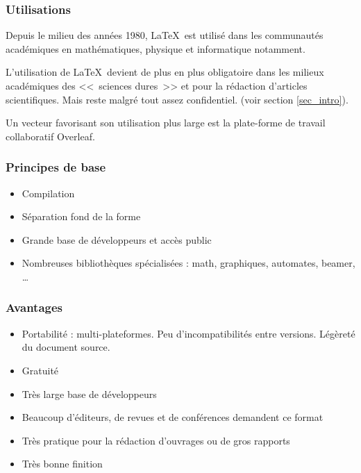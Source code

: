 \documentclass[a4paper, french]{article}
\begin{document}
\subsubsection{Utilisations} 

Depuis le milieu des années 1980, \LaTeX ~est utilisé dans les communautés académiques en mathématiques, physique et informatique notamment.

L'utilisation de \LaTeX ~devient de plus en plus obligatoire dans les milieux académiques des <<~sciences dures~>> et pour la rédaction d'articles scientifiques. Mais reste malgré tout assez confidentiel. (voir section \ref{sec_intro}).

Un vecteur favorisant son utilisation plus large est la plate-forme de travail collaboratif Overleaf. 


\subsubsection{Principes de base} 

\begin{itemize}
   \item Compilation
   \item Séparation fond de la forme
   \item Grande base de développeurs et accès public
   \item Nombreuses bibliothèques spécialisées : math, graphiques, automates, beamer, …
\end{itemize}


\subsubsection{Avantages} 

\begin{itemize}
   \item Portabilité : multi-plateformes. Peu d’incompatibilités entre versions. Légèreté du document source.
   \item Gratuité
   \item Très large base de développeurs
   \item Beaucoup d’éditeurs, de revues et de conférences demandent ce format
   \item Très pratique pour la rédaction d’ouvrages ou de gros rapports
   \item Très bonne finition
\end{itemize}
\end{document}
